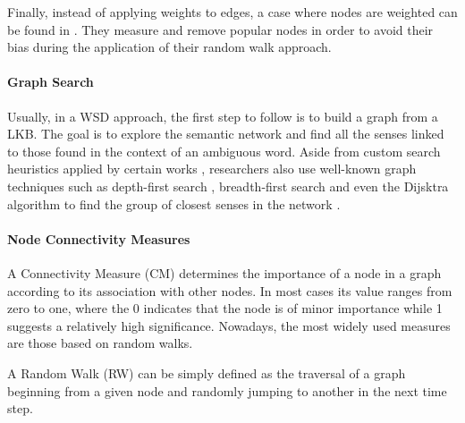 Finally, instead of applying weights to edges, a case where  nodes are weighted can be found in \cite{2013.Kivimaki.AGraph-BasedApproach}. They measure and remove popular nodes in order to avoid their bias during the application of their random walk approach.




 

\paragraph{Graph Search}
Usually, in a WSD approach, the first step to follow is to build a graph from a LKB. The goal is to explore the semantic network and find all the senses linked to  those found in the context of an ambiguous word. Aside from custom search heuristics applied by certain works \cite{2006.Agirre.TwoGraph-basedAlgorithms,2007.Sinha.Mihalcea.Unsupervised,2009.Agirre.PersonalizedPageRankWSD}, researchers also use well-known graph techniques such as depth-first search \cite{2007.Navigli.GraphConnectivity}, breadth-first search \cite{2008.Agirre.Multilingual} and even the Dijsktra  algorithm to find the group of closest senses in the network \cite{2013.Matuschek.Gurevych.Dijsktra.WSA}.


\paragraph{Node Connectivity Measures}\label{sec:connectivity_measures}
A Connectivity Measure (CM) determines the importance of a node in a graph according to its association with other nodes. In most cases its value ranges from zero to one, where the 0 indicates that the node is of minor importance while 1 suggests a relatively high significance. Nowadays, the most widely used  measures are those based on random walks.

A Random Walk (RW) can be simply defined as the traversal of a graph beginning from a given node and randomly jumping to another in the next time step.

